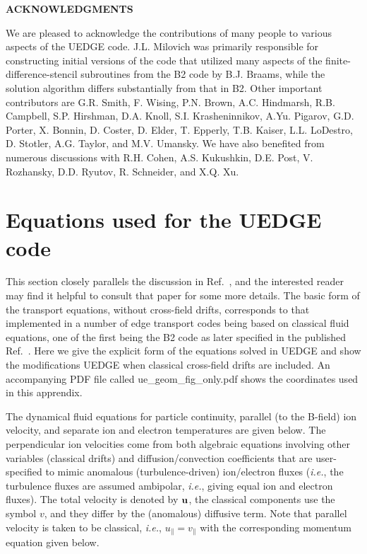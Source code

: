 \documentclass [12pt]{article}
\begin{document}
\noindent
{\bf ACKNOWLEDGMENTS} 

We are pleased to acknowledge the contributions of many people to various
aspects of the {\sf UEDGE} code. J.L. Milovich was primarily responsible for
constructing initial versions of the code that utilized many aspects of the
finite-difference-stencil subroutines from the B2 code by B.J. Braams,
while the solution algorithm differs substantially from that in B2.  Other
important contributors are G.R. Smith, F. Wising, P.N. Brown, A.C. Hindmarsh,
R.B. Campbell, S.P. Hirshman, D.A. Knoll, S.I. Krasheninnikov, A.Yu. Pigarov,
G.D. Porter, X. Bonnin, D. Coster, D. Elder, T. Epperly, T.B. Kaiser,
L.L. LoDestro, D. Stotler, A.G. Taylor, and M.V. Umansky.  We have also
benefited from numerous discussions with R.H. Cohen, A.S. Kukushkin,
D.E. Post, V. Rozhansky, D.D. Ryutov, R. Schneider, and X.Q. Xu.

\appendix
\section{Equations used for the {\sf UEDGE} code} 

This section closely parallels the discussion in Ref.~, and the
interested reader may find it helpful to consult that paper for some more
details.  The basic form of the transport equations, without cross-field
drifts, corresponds to that implemented in a number of edge transport codes
being based on classical fluid equations, one of the first being the B2
\cite{braams87} code as later specified in the published
Ref.~. Here we give the explicit form of the equations
solved in {\sf UEDGE} and show the modifications {\sf UEDGE} when classical 
cross-field drifts are included. An accompanying PDF file called 
{\sf ue\_geom\_fig\_only.pdf} shows the coordinates used in this apprendix.

The dynamical fluid equations for particle continuity, parallel (to the
B-field) ion velocity, and separate ion and electron temperatures are given
below.  The perpendicular ion velocities come from both algebraic equations
involving other variables (classical drifts) and diffusion/convection
coefficients that are user-specified to mimic anomalous (turbulence-driven)
ion/electron fluxes ({\it i.e.}, the turbulence fluxes are assumed ambipolar,
{\it i.e.}, giving equal ion and electron fluxes). The total velocity is
denoted by ${\bf u}$, the classical components use the symbol $v$, and they
differ by the (anomalous) diffusive term.  Note that parallel velocity is
taken to be classical, {\it i.e.}, $u_\| =v_\|$ with the corresponding
momentum equation given below.
\end{document}
